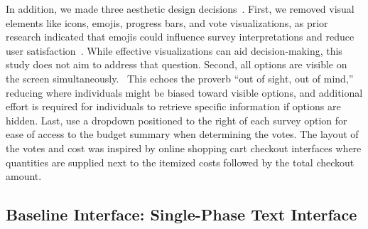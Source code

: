 In addition, we made three aesthetic design decisions~. First, we removed visual elements like icons, emojis, progress bars, and vote visualizations, as prior research indicated that emojis could influence survey interpretations and reduce user satisfaction~\cite{herringGenderAgeInfluences2020, toepoelSmileysStarsHearts2019}. While effective visualizations can aid decision-making, this study does not aim to address that question. Second, all options are visible on the screen simultaneously.~ This echoes the proverb ``out of sight, out of mind,'' reducing where individuals might be biased toward visible options, and additional effort is required for individuals to retrieve specific information if options are hidden. Last, use a dropdown positioned to the right of each survey option for ease of access to the budget summary when determining the votes. The layout of the votes and cost was inspired by online shopping cart checkout interfaces where quantities are supplied next to the itemized costs followed by the total checkout amount.~

\subsection{Baseline Interface: Single-Phase Text Interface}


